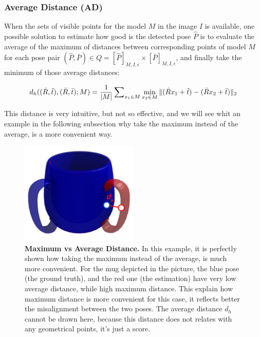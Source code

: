 \subsubsection{Average Distance (AD)}\label{subsubsec:average_distance}
When the sets of visible points for the model $M$ in the image $I$ is available, one possible solution to estimate how good is the detected pose $\hat{P}$ is to evaluate the average of the maximum of distances between corresponding points of model $M$ for each pose pair $(\hat{P}, \bar{P}) \in Q = [\hat{P}]_{M, I, \epsilon} \times [\bar{P}]_{M, I, \epsilon}$, and finally take the minimum of those average distances:

\begin{equation}
    \label{eq:average_distance}
    d_h((\hat{R}, \hat{t}), (\bar{R}, \bar{t}); M) = \dfrac{1}{|M|}  \sum\nolimits_{x_1 \in M} \min_{x_2 \in M} \|{(\hat{R}x_1 + \hat{t}) - (\bar{R}x_2 + \bar{t})}\|_2
\end{equation}

This distance is very intuitive, but not so effective, and we will see whit an example in the following subsection why take the maximum instead of the average, is a more convenient way.

\begin{figure}
    \centering
    \includegraphics[width=0.5\textwidth]{figures/2_benchmarks_and_metrics/max_av_distances_example}
    \caption{\textbf{Maximum vs Average Distance.} In this example, it is perfectly shown how taking the maximum instead of the average, is much more convenient. For the mug depicted in the picture, the blue pose (the ground truth), and the red one (the estimation) have very low average distance, while high maximum distance. This explain how maximum distance is more convenient for this case, it reflects better the misalignment between the two poses. The average distance $d_h$ cannot be drawn here, because this distance does not relates with any geometrical points, it's just a score.} 
    \label{fig:max_av_distances_example}
\end{figure}


